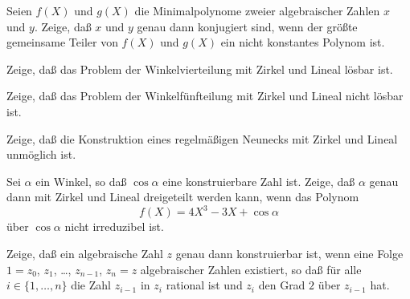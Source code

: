 \documentclass{algsheet}
\author{Dipl.-Math.~Arturo Mancino}
\date{22.~Dezember 2010}
\begin{document}
                \maketitle



\begin{exercise}
    Seien \(f(X)\) und \(g(X)\) die Minimalpolynome zweier algebraischer Zahlen \(x\) und \(y\).
    Zeige, daß \(x\) und \(y\) genau dann konjugiert sind, wenn der größte gemeinsame Teiler von
    \(f(X)\) und \(g(X)\) ein nicht konstantes Polynom ist.
\end{exercise}




\begin{exercise}
    Zeige, daß das Problem der Winkelvierteilung mit Zirkel und Lineal
    lösbar ist.
\end{exercise}

\begin{exercise}
    Zeige, daß das Problem der Winkelfünfteilung mit Zirkel und Lineal nicht
    lösbar ist.
\end{exercise}

\begin{exercise}
    Zeige, daß die Konstruktion eines regelmäßigen Neunecks mit Zirkel und Lineal
    unmöglich ist.
\end{exercise}

\begin{exercise}
    Sei \(\alpha\) ein Winkel, so daß \(\cos \alpha\) eine konstruierbare Zahl ist.
    Zeige, daß \(\alpha\) genau dann mit Zirkel und Lineal dreigeteilt
    werden kann, wenn das Polynom
    \begin{equation}
        f(X) = 4 X^3 - 3 X + \cos \alpha
    \end{equation}
    über \(\cos \alpha\) nicht irreduzibel ist.
\end{exercise}

\begin{exercise}
    Zeige, daß ein algebraische Zahl \(z\) genau dann konstruierbar ist, wenn eine
    Folge \(1 = z_0\), \(z_1\), \dots, \(z_{n - 1}\), \(z_n = z\) algebraischer
    Zahlen existiert, so daß für alle \(i \in \{1, \dots, n\}\) die Zahl
    \(z_{i - 1}\) in \(z_i\) rational ist und \(z_i\) den Grad \(2\) über
    \(z_{i - 1}\) hat.
\end{exercise}
\end{document}
